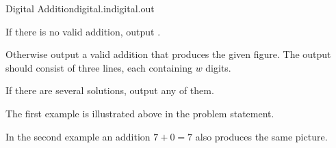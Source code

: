 \begin{problem}{Digital Addition}{digital.in}{digital.out}{\timeLimit}
\OutputFile

If there is no valid addition, output .

Otherwise output a valid addition that produces the given figure.
The output should consist of three lines, each containing $w$ digits.

If there are several solutions, output any of them.

\Examples

\begin{example}
%
%
%
\end{example}

The first example is illustrated above in the problem statement.

In the second example an addition $7+0=7$ also produces the same picture.

\end{problem}

